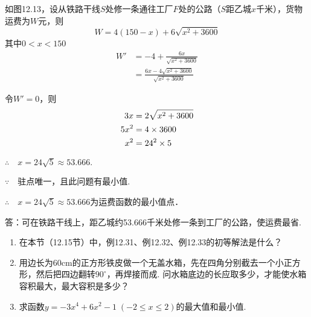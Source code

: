 \begin{solution}

\noindent
\begin{minipage}{.6\textwidth}
 \CTEXindent   如图12.13，设从铁路干线$S$处修一条通往工厂$F$处的公路（$S$距乙城$x$千米），货物运费为$W$元，则
\[W=4(150-x)+6\sqrt{x^2+3600}\]
其中$0<x<150$
\[\begin{split}
    W'&=-4+\frac{6x}{\sqrt{x^2+3600}}\\
    &=\frac{6x-4\sqrt{x^2+3600}}{\sqrt{x^2+3600}}
\end{split}\]
\end{minipage}
\hfill
\begin{minipage}{.35\textwidth}
\centering
{}
\end{minipage}

令$W'=0$，则
\[\begin{split}
    3x&=2\sqrt{x^2+3600}\\
    5x^2&=4\times 3600\\
    x^2&=24^2\times 5
\end{split}\]

$\therefore\quad x=24\sqrt{5}\approx 53.666.$

$\because\quad $驻点唯一，且此问题有最小值.

$\therefore\quad x=24\sqrt{5}\approx 53.666$为运费函数的最小值点．    

答：可在铁路干线上，距乙城约53.666千米处修一条到工厂的公路，使运费最省.
\end{solution}

\begin{ex}
\begin{enumerate}
    \item 在本节（12.15节）中，例12.31、例12.32、例12.33的初等解法是什么？
    \item 用边长为60cm的正方形铁皮做一个无盖水箱，先在四角分别截去一个小正方形，然后把四边翻转$90^{\circ}$，再焊接而成. 问水箱底边的长应取多少，才能使水箱容积最大，最大容积是多少？
    \item 求函数$y=-3x^4+6x^2-1\; (-2\le x\le 2)$的最大值和最小值.
\end{enumerate}
\end{ex}

